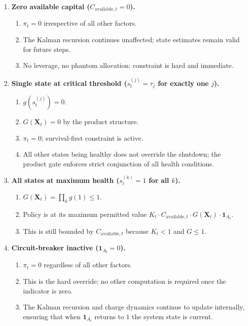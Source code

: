 \documentclass[12pt,openany]{book}
\numberwithin{equation}{chapter}
\theoremstyle{plain}
\theoremstyle{definition}
\theoremstyle{remark}
\def\mathcal#1{#1}%
\begin{document}
\begin{enumerate}
  \item \textbf{Zero available capital ($C_{\mathrm{available},t} = 0$).}
        \begin{enumerate}
          \item $\pi_t = 0$ irrespective of all other factors.
          \item The Kalman recursion continues unaffected;
                state estimates remain valid for future steps.
          \item No leverage, no phantom allocation: constraint
                is hard and immediate.
        \end{enumerate}

  \item \textbf{Single state at critical threshold
        ($s^{(j)}_t = \tau_j$ for exactly one $j$).}
        \begin{enumerate}
          \item $g(s^{(j)}_t) = 0$.
          \item $G(\mathbf{X}_t) = 0$ by the product structure.
          \item $\pi_t = 0$; survival-first constraint is active.
          \item All other states being healthy does not override
                the shutdown; the product gate enforces strict
                conjunction of all health conditions.
        \end{enumerate}

  \item \textbf{All states at maximum health
        ($s^{(k)}_t = 1$ for all $k$).}
        \begin{enumerate}
          \item $G(\mathbf{X}_t) = \prod_k g(1) \le 1$.
          \item Policy is at its maximum permitted value
                $K_t \cdot C_{\mathrm{available},t}
                \cdot G(\mathbf{X}_t) \cdot
                \mathbf{1}_{\mathcal{A}_t}$.
          \item This is still bounded by $C_{\mathrm{available},t}$
                because $K_t < 1$ and $G \le 1$.
        \end{enumerate}

  \item \textbf{Circuit-breaker inactive
        ($\mathbf{1}_{\mathcal{A}_t} = 0$).}
        \begin{enumerate}
          \item $\pi_t = 0$ regardless of all other factors.
          \item This is the hard override; no other computation
                is required once the indicator is zero.
          \item The Kalman recursion and charge dynamics
                continue to update internally, ensuring that
                when $\mathbf{1}_{\mathcal{A}_t}$ returns to $1$
                the system state is current.
        \end{enumerate}


\end{enumerate}
\end{document}
